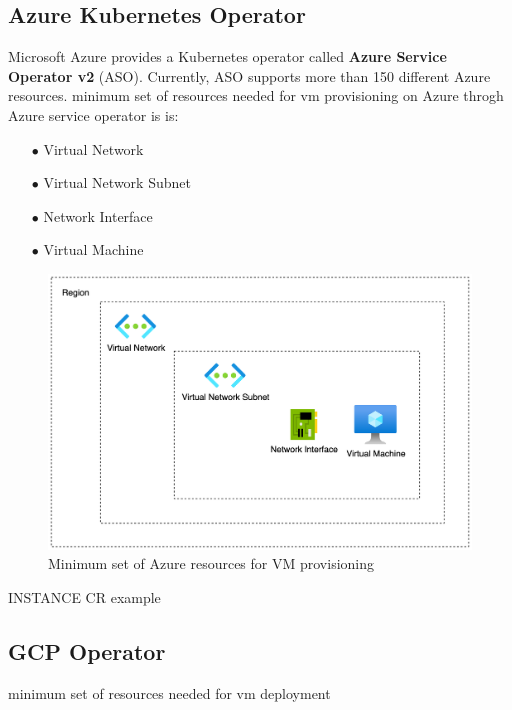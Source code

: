 \newpage

\subsection{Azure Kubernetes Operator}

Microsoft Azure provides a Kubernetes operator called \textbf{Azure Service Operator v2} (ASO).
Currently, ASO supports more than 150 different Azure resources.
minimum set of resources needed for vm provisioning on Azure throgh Azure service operator is is:

\begin{itemize}[itemsep=0.2pt, topsep=1pt] \item[$\bullet$] Virtual Network 
\item[$\bullet$] Virtual Network Subnet
\item[$\bullet$] Network Interface
\item[$\bullet$] Virtual Machine
\end{itemize}

\begin{figure}[H]
\centering
\includegraphics[width=0.75\linewidth]{images/azure.png}
\caption{Minimum set of Azure resources for VM provisioning}
\label{fig:azure}
\end{figure}






INSTANCE CR example











\subsection{GCP Operator}

minimum set of resources needed for vm deployment


